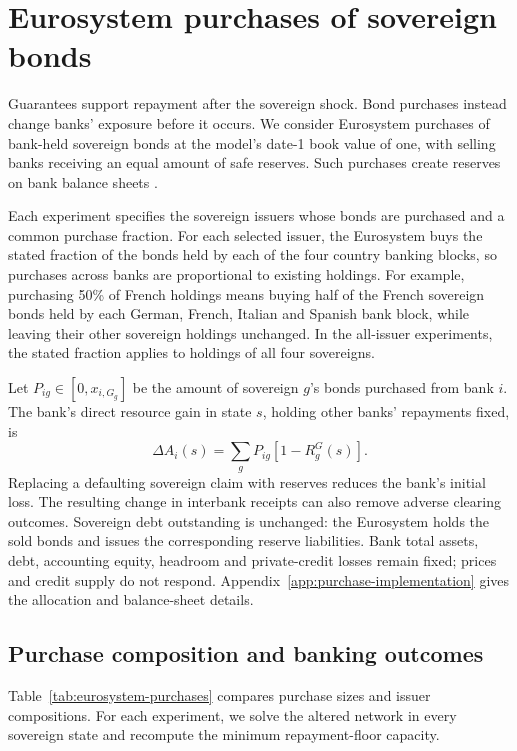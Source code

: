 \section{Eurosystem purchases of sovereign bonds}\label{sec:eurosystem-purchases}

Guarantees support repayment after the sovereign shock. Bond purchases instead change banks' exposure before it occurs. We consider Eurosystem purchases of bank-held sovereign bonds at the model's date-1 book value of one, with selling banks receiving an equal amount of safe reserves. Such purchases create reserves on bank balance sheets \citep{ECBReserves2021}.

Each experiment specifies the sovereign issuers whose bonds are purchased and a common purchase fraction. For each selected issuer, the Eurosystem buys the stated fraction of the bonds held by each of the four country banking blocks, so purchases across banks are proportional to existing holdings. For example, purchasing 50\% of French holdings means buying half of the French sovereign bonds held by each German, French, Italian and Spanish bank block, while leaving their other sovereign holdings unchanged. In the all-issuer experiments, the stated fraction applies to holdings of all four sovereigns.

Let $P_{ig}\in[0,x_{i,G_g}]$ be the amount of sovereign $g$'s bonds purchased from bank $i$. The bank's direct resource gain in state $s$, holding other banks' repayments fixed, is
\[
 \Delta A_i(s)=\sum_gP_{ig}[1-R_g^G(s)].
\]
Replacing a defaulting sovereign claim with reserves reduces the bank's initial loss. The resulting change in interbank receipts can also remove adverse clearing outcomes. Sovereign debt outstanding is unchanged: the Eurosystem holds the sold bonds and issues the corresponding reserve liabilities. Bank total assets, debt, accounting equity, headroom and private-credit losses remain fixed; prices and credit supply do not respond. Appendix~\ref{app:purchase-implementation} gives the allocation and balance-sheet details.

\subsection{Purchase composition and banking outcomes}

Table~\ref{tab:eurosystem-purchases} compares purchase sizes and issuer compositions. For each experiment, we solve the altered network in every sovereign state and recompute the minimum repayment-floor capacity.


